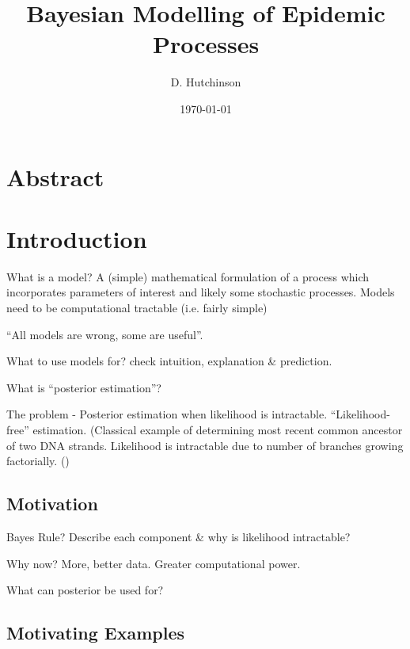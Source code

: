 \documentclass[11pt,a4paper,margin=0]{article}
\theoremstyle{break}
\begin{document}
\title{Bayesian Modelling of Epidemic Processes}
\author{D. Hutchinson}
\date{\today}
\maketitle
\newpage

\section*{Abstract}\label{sec_abstract}
\newpage

\tableofcontents\newpage

\section{Introduction}\label{sec_introduction}

  \par What is a model? A (simple) mathematical formulation of a process which incorporates parameters of interest and likely some stochastic processes. Models need to be computational tractable (i.e. fairly simple)
  \par ``All models are wrong, some are useful''.
  \par What to use models for? check intuition, explanation \& prediction.
  \par What is ``posterior estimation''?
  \par The problem - Posterior estimation when likelihood is intractable. ``Likelihood-free'' estimation. (Classical example of determining most recent common ancestor of two DNA strands. Likelihood is intractable due to number of branches growing factorially. (\cite[]{selecting_summary_stats_in_ABC_for_calibration})

\subsection*{Motivation}\label{sec_motivation}

  \par Bayes Rule? Describe each component \& why is likelihood intractable?
  \par Why now? More, better data. Greater computational power.
  \par What can posterior be used for?

\subsection*{Motivating Examples}\label{sec_motivating_examples}
\end{document}
